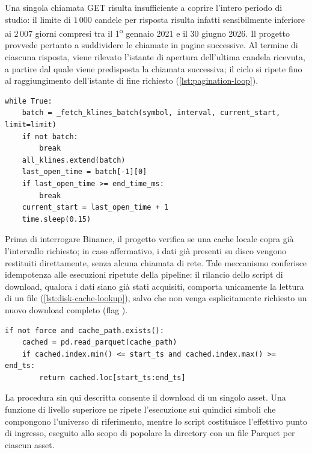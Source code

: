 Una singola chiamata GET risulta insufficiente a coprire l'intero periodo di studio: il limite di $1\,000$ candele per risposta risulta infatti sensibilmente inferiore ai $2\,007$ giorni compresi tra il 1\textsuperscript{o} gennaio 2021 e il 30 giugno 2026. Il progetto provvede pertanto a suddividere le chiamate in pagine successive. Al termine di ciascuna risposta, viene rilevato l'istante di apertura dell'ultima candela ricevuta, a partire dal quale viene predisposta la chiamata successiva; il ciclo si ripete fino al raggiungimento dell'istante di fine richiesto (\cref{lst:pagination-loop}).

\begin{listing}[H]
\begin{verbatim}
while True:
    batch = _fetch_klines_batch(symbol, interval, current_start, limit=limit)
    if not batch:
        break
    all_klines.extend(batch)
    last_open_time = batch[-1][0]
    if last_open_time >= end_time_ms:
        break
    current_start = last_open_time + 1
    time.sleep(0.15)
\end{verbatim}
\caption{\texttt{\_fetch\_klines\_paginated}}
\label{lst:pagination-loop}
\end{listing}

Prima di interrogare Binance, il progetto verifica se una cache locale copra già l'intervallo richiesto; in caso affermativo, i dati già presenti su disco vengono restituiti direttamente, senza alcuna chiamata di rete. Tale meccanismo conferisce idempotenza alle esecuzioni ripetute della pipeline: il rilancio dello script di download, qualora i dati siano già stati acquisiti, comporta unicamente la lettura di un file (\cref{lst:disk-cache-lookup}), salvo che non venga esplicitamente richiesto un nuovo download completo (flag ).

\begin{listing}[H]
\begin{verbatim}
if not force and cache_path.exists():
    cached = pd.read_parquet(cache_path)
    if cached.index.min() <= start_ts and cached.index.max() >= end_ts:
        return cached.loc[start_ts:end_ts]
\end{verbatim}
\caption{\texttt{fetch\_klines}}
\label{lst:disk-cache-lookup}
\end{listing}

La procedura sin qui descritta consente il download di un singolo asset. Una funzione di livello superiore ne ripete l'esecuzione sui quindici simboli che compongono l'universo di riferimento, mentre lo script  costituisce l'effettivo punto di ingresso, eseguito allo scopo di popolare la directory  con un file Parquet per ciascun asset.

